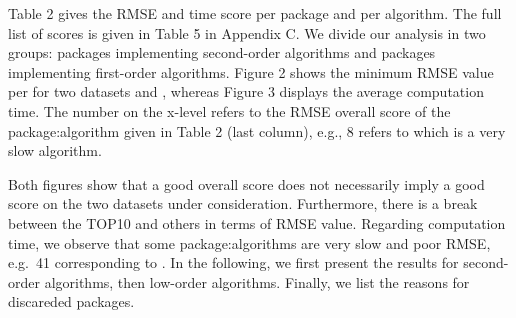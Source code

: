 Table 2 gives the RMSE and time score per package and per algorithm. The
full list of scores is given in Table 5 in Appendix C. We divide our
analysis in two groups: packages implementing second-order algorithms
and packages implementing first-order algorithms. Figure 2 shows the
minimum RMSE value per  for two datasets
 and , whereas Figure 3 displays the
average computation time. The number on the x-level refers to the RMSE
overall score of the package:algorithm given in Table 2 (last column),
e.g., 8 refers to  which is a very slow
algorithm.

Both figures show that a good overall score does not necessarily imply a
good score on the two datasets under consideration. Furthermore, there
is a break between the TOP10  and others in
terms of RMSE value. Regarding computation time, we observe that some
package:algorithms are very slow and poor RMSE, e.g.~41 corresponding to
. In the following, we first present the
results for second-order algorithms, then low-order algorithms. Finally,
we list the reasons for discareded packages.

